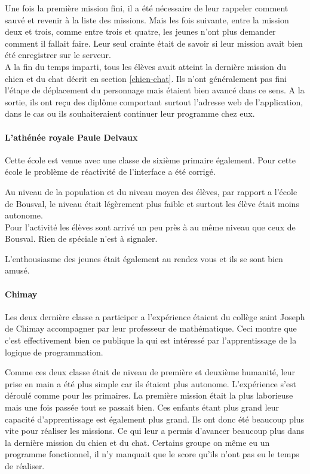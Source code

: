 Une fois la première mission fini, il a été nécessaire de leur rappeler comment sauvé et revenir à la liste des missions. Mais les fois suivante, entre la mission deux et trois, comme entre trois et quatre, les jeunes n'ont plus demander comment il fallait faire. Leur seul crainte était de savoir si leur mission avait bien été enregistrer sur le serveur.\\

A la fin du temps imparti, tous les élèves avait atteint la dernière mission du chien et du chat décrit en section \ref{chien-chat}. Ils n'ont généralement pas fini l'étape de déplacement du personnage mais étaient bien avancé dans ce sens. A la sortie, ils ont reçu des diplôme comportant surtout l'adresse web de l'application, dans le cas ou ils souhaiteraient continuer leur programme chez eux.

\paragraph{L'athénée royale Paule Delvaux}
Cette école est venue avec une classe de sixième primaire également. Pour cette école le problème de réactivité de l'interface a été corrigé.

Au niveau de la population et du niveau moyen des élèves, par rapport a l'école de Bousval, le niveau était légèrement plus faible et surtout les élève était moins autonome.\\

Pour l'activité les élèves sont arrivé un peu près à au même niveau que ceux de Bousval. Rien de spéciale n'est à signaler.

L'enthousiasme des jeunes était également au rendez vous et ils se sont bien amusé.

\paragraph{Chimay}
Les deux dernière classe a participer a l'expérience étaient du collège saint Joseph de Chimay accompagner par leur professeur de mathématique. Ceci montre que c'est effectivement bien ce publique la qui est intéressé par l'apprentissage de la logique de programmation.

Comme ces deux classe était de niveau de première et deuxième humanité, leur prise en main a été plus simple car ils étaient plus autonome. L'expérience s'est déroulé comme pour les primaires. La première mission était la plus laborieuse mais une fois passée tout se passait bien. Ces enfants étant plus grand leur capacité d'apprentissage est également plus grand. Ils ont donc été beaucoup plus vite pour réaliser les missions. Ce qui leur a permis d'avancer beaucoup plus dans la dernière mission du chien et du chat. Certains groupe on même eu un programme fonctionnel, il n'y manquait que le score qu'ils n'ont pas eu le temps de réaliser.\\

